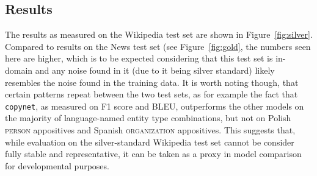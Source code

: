 \subsection{Results}
The results as measured on the Wikipedia test set are shown in Figure~\ref{fig:silver}. Compared to results on the News test set (see Figure~\ref{fig:gold}, the numbers seen here are higher, which is to be expected considering that this test set is in-domain and any noise found in it (due to it being silver standard) likely resembles the noise found in the training data. It is worth noting though, that certain patterns repeat between the two test sets, as for example the fact that \texttt{copynet}, as measured on F1 score and BLEU, outperforms the other models on the majority of language-named entity type combinations, but not on Polish \textsc{person} appositives and Spanish \textsc{organization} appositives. This suggests that, while evaluation on the silver-standard Wikipedia test set cannot be consider fully stable and representative, it can be taken as a proxy in model comparison for developmental purposes.
